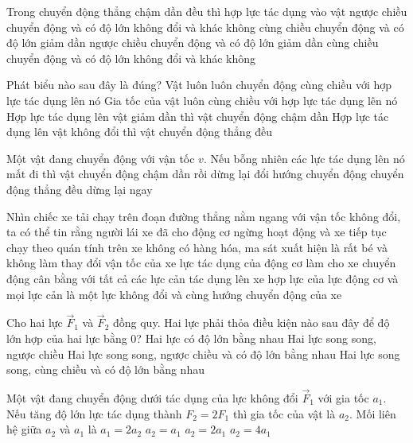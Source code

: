 \begin{ex}
	Trong chuyển động thẳng chậm dần đều thì hợp lực tác dụng vào vật
	\choice
	{\True ngược chiều chuyển động và có độ lớn không đổi và khác không}
	{cùng chiều chuyển động và có độ lớn giảm dần}
	{ngược chiều chuyển động và có độ lớn giảm dần}
	{cùng chiều chuyển động và có độ lớn không đổi và khác không}
	\loigiai{}
\end{ex}
\begin{ex}
	Phát biểu nào sau đây là đúng?
	\choice
	{Vật luôn luôn chuyển động cùng chiều với hợp lực tác dụng lên nó}
	{\True Gia tốc của vật luôn cùng chiều với hợp lực tác dụng lên nó}
	{Hợp lực tác dụng lên vật giảm dần thì vật chuyển động chậm dần}
	{Hợp lực tác dụng lên vật không đổi thì vật chuyển động thẳng đều}
	\loigiai{}
\end{ex}
\begin{ex}
	Một vật đang chuyển động với vận tốc $v$. Nếu bỗng nhiên các lực tác dụng lên nó mất đi thì vật
	\choice
	{chuyển động chậm dần rồi dừng lại}
	{đổi hướng chuyển động}
	{\True chuyển động thẳng đều}
	{dừng lại ngay}
	\loigiai{}
\end{ex}
\begin{ex}
	Nhìn chiếc xe tải chạy trên đoạn đường thẳng nằm ngang với vận tốc không đổi, ta có thể tin rằng
	\choice
	{người lái xe đã cho động cơ ngừng hoạt động và xe tiếp tục chạy theo quán tính}
	{trên xe không có hàng hóa, ma sát xuất hiện là rất bé và không làm thay đổi vận tốc của xe}
	{\True lực tác dụng của động cơ làm cho xe chuyển động cân bằng với tất cả các lực cản tác dụng lên xe}
	{hợp lực của lực động cơ và mọi lực cản là một lực không đổi và cùng hướng chuyển động của xe}
	\loigiai{}
\end{ex}
\begin{ex}
	Cho hai lực $\vec{F}_1$ và $\vec{F}_2$ đồng quy. Hai lực phải thỏa điều kiện nào sau đây để độ lớn hợp của hai lực bằng 0?
	\choice
	{Hai lực có độ lớn bằng nhau}
	{Hai lực song song, ngược chiều}
	{\True Hai lực song song, ngược chiều và có độ lớn bằng nhau}
	{Hai lực song song, cùng chiều và có độ lớn bằng nhau}
	\loigiai{}
\end{ex}
\begin{ex}
	Một vật đang chuyển động dưới tác dụng của lực không đổi $\vec{F}_1$ với gia tốc $a_1$. Nếu tăng độ lớn lực tác dụng thành $F_2=2F_1$ thì gia tốc của vật là $a_2$. Mối liên hệ giữa $a_2$ và $a_1$ là
	\choice
	{$a_1=2a_2$}
	{$a_2=a_1$}
	{\True $a_2=2a_1$}
	{$a_2=4a_1$}
	\loigiai{}
\end{ex}

